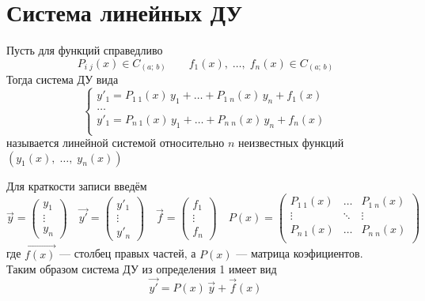 \author{Tkachuk Andrei}

\section{Система линейных ДУ}

\begin{Def}
    Пусть для функций справедливо 
    \[
    P_{i\;j}(x)\in C_{(a;\,b)} \qquad f_1(x),\; \dots,\; f_n(x) \in C_{(a;\,b)}
    \]
    Тогда система ДУ вида
    \[
    \begin{cases}   
    y'_1 = P_{1\;1}(x)\,y_1 + \dots + P_{1\;n}(x)\,y_n + f_1(x)\\
    \dots\\
    y'_1 = P_{n\;1}(x)\,y_1 + \dots + P_{n\;n}(x)\,y_n + f_n(x)\\
    
    \end{cases}
    \]
    называется линейной системой относительно $n$ неизвестных функций $(y_1(x),\; \dots,\; y_n(x))$
\end{Def}

\begin{Note}
    Для краткости записи введём
    \[
        \vec{y} = \begin{pmatrix}y_1\\ \vdots\\ y_n \end{pmatrix} \quad 
        \vec{y'} = \begin{pmatrix}y'_1\\ \vdots\\ y'_n \end{pmatrix} \quad 
        \vec{f} = \begin{pmatrix}f_1\\ \vdots\\ f_n \end{pmatrix} \quad 
        P(x) = 
        \begin{pmatrix}
            P_{1\;1}(x) & \dots & P_{1\;n}(x)\\
            \vdots & \ddots & \vdots\\
            P_{n\;1}(x) & \dots & P_{n\;n}(x)\\
        \end{pmatrix}
    \]
    где $\vec{f(x)}$ --- столбец правых частей, а $P(x)$ --- матрица коэфициентов.\\
    Таким образом система ДУ из определения 1 имеет вид
    \[
        \vec{y'} = P(x)\,\vec{y} + \vec{f}(x)
    \]
\end{Note}

